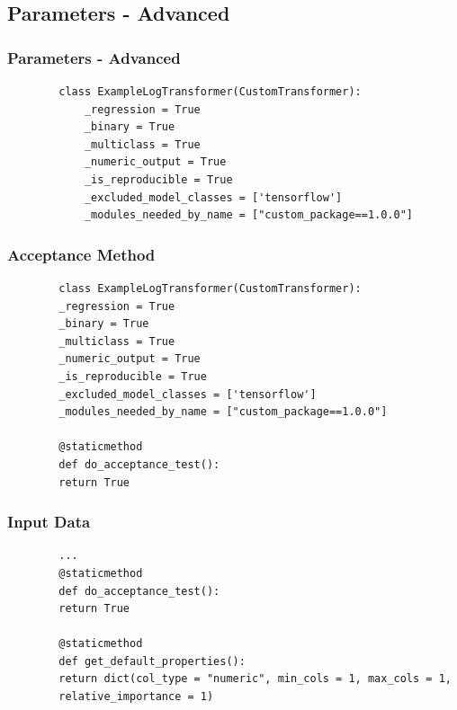 \documentclass[11pt,
               aspectratio=169,
               hyperref={colorlinks}
               ]{beamer}
\begin{document}
		\subsection{Parameters - Advanced}
	\begin{frame}[fragile]
		\frametitle{Parameters - Advanced}
		\begin{verbatim}
		class ExampleLogTransformer(CustomTransformer):
			_regression = True
			_binary = True
			_multiclass = True
			_numeric_output = True
			_is_reproducible = True
			_excluded_model_classes = ['tensorflow']
			_modules_needed_by_name = ["custom_package==1.0.0"]
		\end{verbatim}
			
\end{frame}
	\begin{frame}[fragile]
		\frametitle{Acceptance Method}
		\begin{verbatim}
		class ExampleLogTransformer(CustomTransformer):
		_regression = True
		_binary = True
		_multiclass = True
		_numeric_output = True
		_is_reproducible = True
		_excluded_model_classes = ['tensorflow']
		_modules_needed_by_name = ["custom_package==1.0.0"]
	
		@staticmethod
		def do_acceptance_test():
		return True
		\end{verbatim}
			
\end{frame}
	\begin{frame}[fragile]
		\frametitle{Input Data}
		\begin{verbatim}
		...
		@staticmethod
		def do_acceptance_test():
		return True

		@staticmethod
		def get_default_properties():
		return dict(col_type = "numeric", min_cols = 1, max_cols = 1, 
		relative_importance = 1)
		\end{verbatim}
\end{frame}
\end{document}
